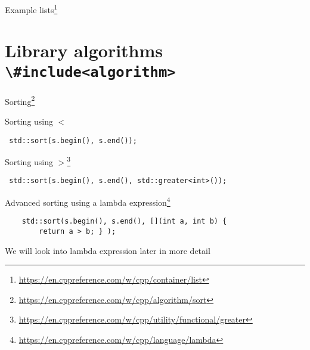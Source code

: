 \documentclass[12pt,t]{beamer}
\begin{document}
\begin{frame}{Example lists\footnote{\tiny\url{https://en.cppreference.com/w/cpp/container/list}}}



\end{frame}

\section{Library algorithms \lstinline|\#include<algorithm>|}


\begin{frame}[fragile]{Sorting\footnote{\tiny\url{https://en.cppreference.com/w/cpp/algorithm/sort}}}

\begin{block}{Sorting using $<$}
\vspace{-0.25cm}
\begin{lstlisting}
 std::sort(s.begin(), s.end());
\end{lstlisting}
\end{block}

\begin{block}{Sorting using $>$\footnote{\tiny\url{https://en.cppreference.com/w/cpp/utility/functional/greater}}}
\vspace{-0.25cm}
\begin{lstlisting}
 std::sort(s.begin(), s.end(), std::greater<int>());
\end{lstlisting}
\end{block}
\vspace{-0.25cm}
\begin{block}{Advanced sorting using a lambda expression\footnote{\tiny\url{https://en.cppreference.com/w/cpp/language/lambda}} }
\vspace{-0.25cm}
\begin{lstlisting}
    std::sort(s.begin(), s.end(), [](int a, int b) {
        return a > b; } );
\end{lstlisting}
\end{block}
We will look into lambda expression later in more detail
\end{frame}
\end{document}
